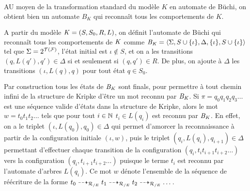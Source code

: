 AU moyen de la transformation standard du modèle $K$ en automate de Büchi, on obtient
bien un automate $B_K$ qui reconnaît tous les comportements de $K$.

\begin{definition}
  A partir du modèle $\mathit K = (S, S_0, R, L)$, on définit l'automate de Büchi
  qui reconnaît tous les comportements de $\mathit K$ comme $\mathit B_\mathit K =\langle \Sigma, S \cup \{\iota\}, \Delta, \{\iota\}, S \cup \{\iota\}\rangle$
  tel que $\Sigma = 2^{\mathcal{T(F)}}$, l'état initial est $\iota \not\in S$, et on a les transitions $(q, L(q'), q') \in \Delta$ si et seulement si $(q, q') \in R$.
  De plus, on ajoute à $\Delta$ les transitions $(\iota, L(q), q)$ pour tout état $q \in S_0$.
\end{definition}
Par construction tous les états de $\mathit B_\mathit K$ sont finals, pour permettre à tout chemin infini
de la structure de Kripke d'être un mot reconnu par $\mathit B_\mathit K$.
Si $\pi=q_0q_1q_2q_3\dots$ est une séquence valide d'états dans la structure de Kripke,
alors le mot $w = t_0t_1t_2\dots$ tels que pour tout $i \in \mathbb N$ $t_i \in L(q_i)$ est reconnu par $\mathit B_\mathit K$.
En effet, on a le triplet $(\iota, L(q_0), q_0) \in \Delta$ qui permet d'amorcer la reconnaissance à partir de la
configuration initiale $(\iota,w)$, 
puis le triplet $(q_i, L(q_i), q_{i+1}) \in \Delta$ permettant d'effectuer chaque transition de 
la configuration $(q_i, t_it_{i+1}t_{i+2}\dots)$ vers la configuration $(q_i, t_{i+1}t_{i+2}\dots)$
puisque le terme $t_i$ est reconnu par l'automate d'arbres $L(q_i)$.
Ce mot $w$ dénote l'ensemble de la séquence de réécriture de la forme
$t_0 \dashrightarrow_{\mathcal R_{/E}} t_1 \dashrightarrow_{\mathcal R_{/E}} t_2 \dashrightarrow_{\mathcal R_{/E}} \dots$. %

